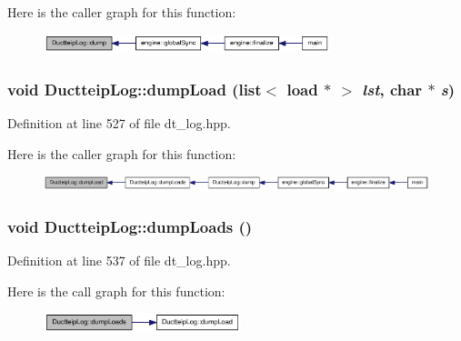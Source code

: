 Here is the caller graph for this function:\nopagebreak
\begin{figure}[H]
\begin{center}
\leavevmode
\includegraphics[width=236pt]{class_ductteip_log_ade6cb12a251c5e220725999980b16566_icgraph}
\end{center}
\end{figure}
\hypertarget{class_ductteip_log_a4e66deabb0265c848d13f6dc99cd52e0}{
\subsubsection[{dumpLoad}]{\setlength{\rightskip}{0pt plus 5cm}void DuctteipLog::dumpLoad (list$<$ load $\ast$ $>$ {\em lst}, \/  char $\ast$ {\em s})}}
\label{class_ductteip_log_a4e66deabb0265c848d13f6dc99cd52e0}


Definition at line 527 of file dt\_\-log.hpp.

Here is the caller graph for this function:\nopagebreak
\begin{figure}[H]
\begin{center}
\leavevmode
\includegraphics[width=395pt]{class_ductteip_log_a4e66deabb0265c848d13f6dc99cd52e0_icgraph}
\end{center}
\end{figure}
\hypertarget{class_ductteip_log_a26e1bca52b880675a247a54cca4a6b1f}{
\subsubsection[{dumpLoads}]{\setlength{\rightskip}{0pt plus 5cm}void DuctteipLog::dumpLoads ()}}
\label{class_ductteip_log_a26e1bca52b880675a247a54cca4a6b1f}


Definition at line 537 of file dt\_\-log.hpp.

Here is the call graph for this function:\nopagebreak
\begin{figure}[H]
\begin{center}
\leavevmode
\includegraphics[width=163pt]{class_ductteip_log_a26e1bca52b880675a247a54cca4a6b1f_cgraph}
\end{center}
\end{figure}


